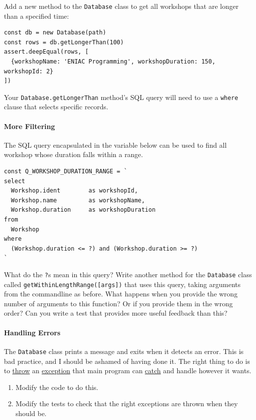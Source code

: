 Add a new method to the \texttt{Database} class to get all workshops
that are longer than a specified time:

\begin{verbatim}
const db = new Database(path)
const rows = db.getLongerThan(100)
assert.deepEqual(rows, [
  {workshopName: 'ENIAC Programming', workshopDuration: 150, workshopId: 2}
])
\end{verbatim}

Your \texttt{Database.getLongerThan} method's SQL query will need to use
a \texttt{where} clause that selects specific records.

\paragraph{More Filtering}\label{more-filtering}

The SQL query encapsulated in the variable below can be used to find all
workshop whose duration falls within a range.

\begin{verbatim}
const Q_WORKSHOP_DURATION_RANGE = `
select
  Workshop.ident        as workshopId,
  Workshop.name         as workshopName,
  Workshop.duration     as workshopDuration
from
  Workshop
where
  (Workshop.duration <= ?) and (Workshop.duration >= ?)
`
\end{verbatim}

What do the \texttt{?}s mean in this query? Write another method for the
\texttt{Database} class called \texttt{getWithinLengthRange({[}args{]})}
that uses this query, taking arguments from the commandline as before.
What happens when you provide the wrong number of arguments to this
function? Or if you provide them in the wrong order? Can you write a
test that provides more useful feedback than this?

\paragraph{Handling Errors}\label{handling-errors}

The \texttt{Database} class prints a message and exits when it detects
an error. This is bad practice, and I should be ashamed of having done
it. The right thing to do is to \protect\hyperlink{g:throw}{throw} an
\protect\hyperlink{g:exception}{exception} that main program can
\protect\hyperlink{g:catch}{catch} and handle however it wants.

\begin{enumerate}
\tightlist
\item
  Modify the code to do this.
\item
  Modify the tests to check that the right exceptions are thrown when
  they should be.
\end{enumerate}

